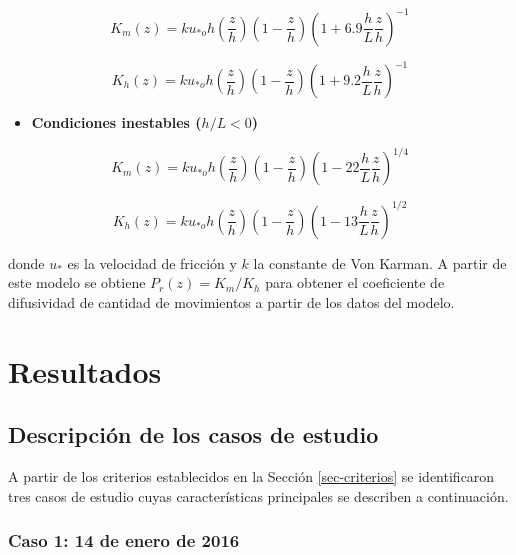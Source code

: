 \documentclass[12pt,spanish,oneside, a4paper]{book}
\providecommand{\tightlist}{%
  \setlength{\itemsep}{0pt}\setlength{\parskip}{0pt}}
\begin{document}
\begin{equation} \label{k-1}
K_m(z) =  ku_{*o}h\left (\frac{z}{h} \right )\left(1-\frac{z}{h} \right)\left (1 + 6.9\frac{h}{L}\frac{z}{h} \right)^{-1}
\end{equation}

\begin{equation} \label{k-2}
K_h(z) =  ku_{*o}h\left (\frac{z}{h} \right )\left(1-\frac{z}{h} \right)\left (1 + 9.2\frac{h}{L}\frac{z}{h} \right)^{-1}
\end{equation}

\begin{itemize}
\tightlist
\item
  \textbf{Condiciones inestables (\(h/L < 0\))}
\end{itemize}

\begin{equation} \label{k-3}
K_m(z) =  ku_{*o}h\left (\frac{z}{h} \right )\left(1-\frac{z}{h} \right)\left (1 - 22\frac{h}{L}\frac{z}{h} \right)^{1/4}
\end{equation}

\begin{equation} \label{k-4}
K_h(z) =  ku_{*o}h\left (\frac{z}{h} \right )\left(1-\frac{z}{h} \right)\left (1 - 13\frac{h}{L}\frac{z}{h} \right)^{1/2}
\end{equation}

donde \(u_*\) es la velocidad de fricción y \(k\) la constante de Von
Karman. A partir de este modelo se obtiene \(P_r(z) = K_m/K_h\) para
obtener el coeficiente de difusividad de cantidad de movimientos a
partir de los datos del modelo.

\chapter{Resultados}\label{resultados}

\section{Descripción de los casos de
estudio}\label{descripcion-de-los-casos-de-estudio}

A partir de los criterios establecidos en la Sección \ref{sec-criterios}
se identificaron tres casos de estudio cuyas características principales
se describen a continuación.

\subsection{Caso 1: 14 de enero de
2016}\label{caso-1-14-de-enero-de-2016}
\end{document}
